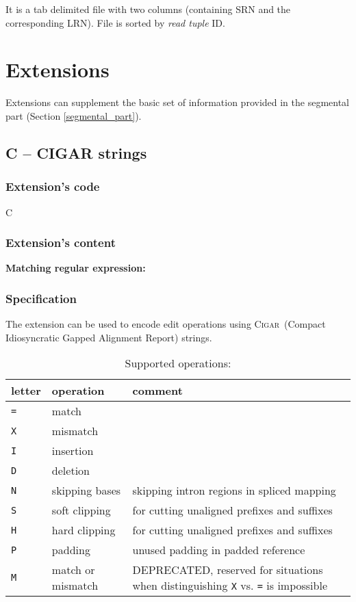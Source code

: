 \documentclass[10pt,a4paper]{article}
\newcommand{\re}[1]{\framebox{\mbox{\texttt{#1}}}}
\newcommand{\mre}[1]{\hspace{0.5cm}\textbf{Matching regular expression:} \re{#1}\smallskip}
\newcommand{\CIGAR}{\textsc{Cigar}}
\begin{document}
\smallskip

It is a
tab delimited file with two columns (containing SRN and the corresponding LRN). File is sorted by {\em read tuple} ID.



\section{Extensions}
\label{sec:extensions}
\appendix

Extensions can supplement the basic set of information provided in the segmental part (Section \ref{segmental_part}).

\subsection*{C -- CIGAR strings}

\subsubsection*{Extension's code}

\hspace{0.5cm} C

\subsubsection*{Extension's content}

\mre{\char94(?:([0-9]+[=XIDNSHPM]+)(?:,(?!\char36)|\char36))+\char36}


\subsubsection*{Specification}

The extension can be used to encode edit operations 
using \CIGAR\  (Compact Idiosyncratic Gapped Alignment Report) strings.

\medskip

\begin{table}[h]
\centering
\caption*{Supported operations:}
\begin{tabular}{|l|l|p{8cm}|}
	\hline
	letter & operation & comment 
	\\\hline
	\texttt{=} & match & \\
	\texttt{X} & mismatch & \\
	\texttt{I} & insertion & \\
	\texttt{D} & deletion &	\\
	\texttt{N} & skipping bases & skipping intron regions in spliced mapping \\
	\texttt{S} & soft clipping &
		for cutting unaligned prefixes and suffixes \\
	\texttt{H} & hard clipping &
		for cutting unaligned prefixes and suffixes \\
	\texttt{P} & padding & unused padding in padded reference\\
	\texttt{M} & match or mismatch	& DEPRECATED, reserved for situations when distinguishing \texttt{X} vs. \texttt{=}
is impossible
	\\\hline
\end{tabular}
\end{table}
\end{document}
